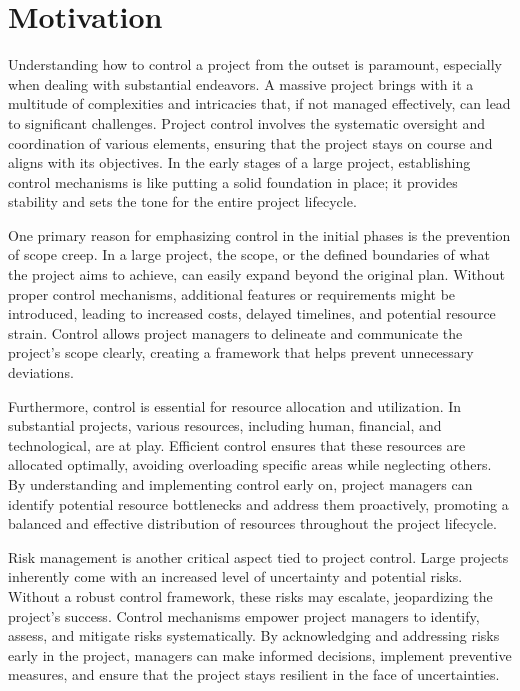 \documentclass[runningheads]{llncs}
\begin{document}
\section{Motivation}
Understanding how to control a project from the outset is paramount, especially when dealing with substantial endeavors. A massive project brings with it a multitude of complexities and intricacies that, if not managed effectively, can lead to significant challenges. Project control involves the systematic oversight and coordination of various elements, ensuring that the project stays on course and aligns with its objectives. In the early stages of a large project, establishing control mechanisms is like putting a solid foundation in place; it provides stability and sets the tone for the entire project lifecycle.

One primary reason for emphasizing control in the initial phases is the prevention of scope creep. In a large project, the scope, or the defined boundaries of what the project aims to achieve, can easily expand beyond the original plan. Without proper control mechanisms, additional features or requirements might be introduced, leading to increased costs, delayed timelines, and potential resource strain. Control allows project managers to delineate and communicate the project's scope clearly, creating a framework that helps prevent unnecessary deviations.

Furthermore, control is essential for resource allocation and utilization. In substantial projects, various resources, including human, financial, and technological, are at play. Efficient control ensures that these resources are allocated optimally, avoiding overloading specific areas while neglecting others. By understanding and implementing control early on, project managers can identify potential resource bottlenecks and address them proactively, promoting a balanced and effective distribution of resources throughout the project lifecycle.

Risk management is another critical aspect tied to project control. Large projects inherently come with an increased level of uncertainty and potential risks. Without a robust control framework, these risks may escalate, jeopardizing the project's success. Control mechanisms empower project managers to identify, assess, and mitigate risks systematically. By acknowledging and addressing risks early in the project, managers can make informed decisions, implement preventive measures, and ensure that the project stays resilient in the face of uncertainties.
\end{document}
